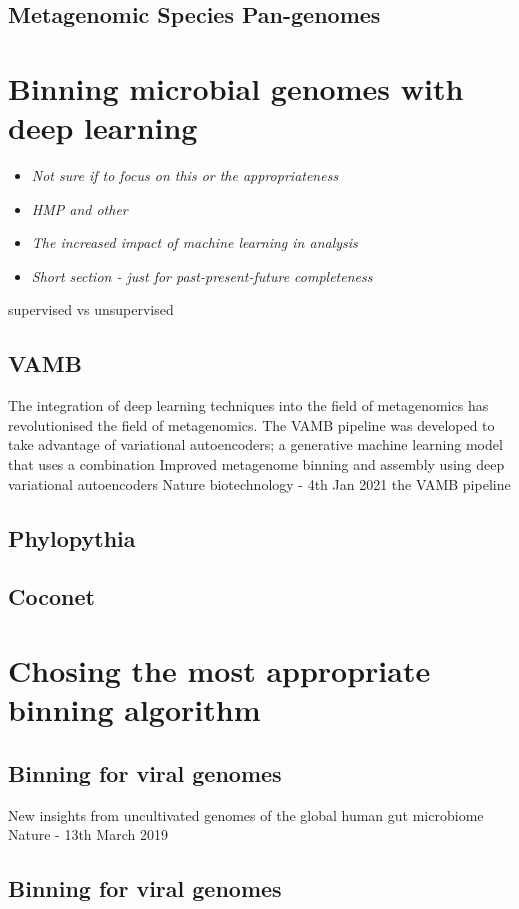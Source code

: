 \documentclass{article}
\begin{document}
\subsection{Metagenomic Species Pan-genomes}

\section{Binning microbial genomes with deep learning}
\begin{itemize}
	\item \emph{Not sure if to focus on this or the appropriateness}
	\item \emph{HMP and other }
	\item \emph{The increased impact of machine learning in analysis}
	\item \emph{Short section - just for past-present-future completeness}
\end{itemize}
supervised vs unsupervised
\subsection{VAMB}
The integration of deep learning techniques into the field of metagenomics has revolutionised the field of metagenomics.
The VAMB pipeline was developed to take advantage of variational autoencoders; a generative machine learning model that uses a combination 
Improved metagenome binning and assembly using deep variational autoencoders
Nature biotechnology - 4th Jan 2021
the VAMB pipeline \cite{nissenimproved}
\subsection{Phylopythia}
\subsection{Coconet}

\section{Chosing the most appropriate binning algorithm}
\subsection{Binning for viral genomes}
New insights from uncultivated genomes of the global human gut microbiome
Nature - 13th March 2019 \cite{nayfach2019new}

\subsection{Binning for viral genomes}
\end{document}
